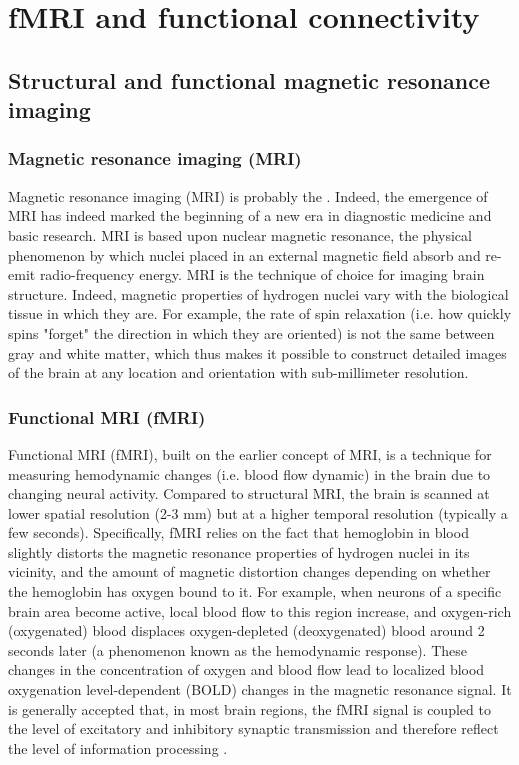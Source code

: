 \cleardoublepage

\chapter{fMRI and functional connectivity }
\label{sec:fmri}

\section{Structural and functional magnetic resonance imaging}
\label{sec:fmri:fmri}

\subsection{Magnetic resonance imaging (MRI)}
\label{sec:fmri:fmri:mri}

Magnetic resonance imaging (MRI) is probably the  \citep{logothetis_what_2008}. Indeed, the emergence of MRI has indeed marked the beginning of a new era in diagnostic medicine and basic research. MRI is based upon nuclear magnetic resonance, the physical phenomenon by which nuclei placed in an external magnetic field absorb and re-emit radio-frequency energy. MRI is the technique of choice for imaging brain structure. Indeed, magnetic properties of hydrogen nuclei vary with the biological tissue in which they are. For example, the rate of spin relaxation (i.e. how quickly spins "forget" the direction in which they are oriented) is not the same between gray and white matter, which thus makes it possible to construct detailed images of the brain at any location and orientation with sub-millimeter resolution.

\subsection{Functional MRI (fMRI)}
\label{sec:fmri:fmri:fmri}

Functional MRI (fMRI), built on the earlier concept of MRI, is a technique for measuring hemodynamic changes (i.e. blood flow dynamic) in the brain due to changing neural activity. Compared to structural MRI, the brain is scanned at lower spatial resolution (2-3 mm) but at a higher temporal resolution (typically a few seconds). Specifically, fMRI relies on the fact that hemoglobin in blood slightly distorts the magnetic resonance properties of hydrogen nuclei in its vicinity, and the amount of magnetic distortion changes depending on whether the hemoglobin has oxygen bound to it. For example, when neurons of a specific brain area become active, local blood flow to this region increase, and oxygen-rich (oxygenated) blood displaces oxygen-depleted (deoxygenated) blood around 2 seconds later (a phenomenon known as the hemodynamic response). These changes in the concentration of oxygen and blood flow lead to localized blood oxygenation level-dependent (BOLD) changes in the magnetic resonance signal. It is generally accepted that, in most brain regions, the fMRI signal is coupled to the level of excitatory and inhibitory synaptic transmission and therefore reflect the level of information processing \citep{logothetis_what_2008}.

